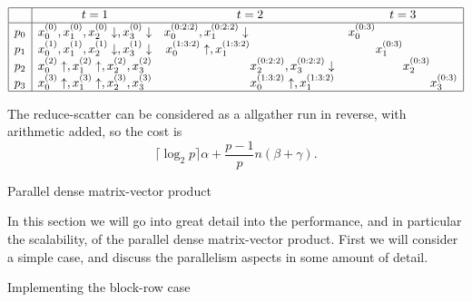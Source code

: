 \[
\begin{array}{|c|ccc|}
\hline
  &t=1&t=2&t=3\\ \hline
p_0&x_0^{(0)},x_1^{(0)},x_2^{(0)}\downarrow,x_3^{(0)}\downarrow
   &x_0^{(0:2:2)},x_1^{(0:2:2)}\downarrow
    \hphantom{x_0^{(0:2:2)},x_1^{(0:2:2)}\downarrow}
   &x_0^{(0:3)}
    \hphantom{x_3^{(0:3)}x_3^{(0:3)}x_3^{(0:3)}}\\
p_1&x_0^{(1)},x_1^{(1)},x_2^{(1)}\downarrow,x_3^{(1)}\downarrow
   &x_0^{(1:3:2)}\uparrow,x_1^{(1:3:2)}
    \hphantom{x_0^{(0:2:2)},x_1^{(0:2:2)}\downarrow}
   &\hphantom{x_3^{(0:3)}} x_1^{(0:3)}
    \hphantom{x_3^{(0:3)}x_3^{(0:3)}} \\
p_2&x_0^{(2)}\uparrow,x_1^{(2)}\uparrow,x_2^{(2)},x_3^{(2)}
   &\hphantom{x_0^{(0:2:2)},x_1^{(0:2:2)}\downarrow}
    x_2^{(0:2:2)},x_3^{(0:2:2)}\downarrow
   &\hphantom{x_3^{(0:3)}x_3^{(0:3)}} x_2^{(0:3)}
    \hphantom{x_3^{(0:3)}}\\
p_3&x_0^{(3)}\uparrow,x_1^{(3)}\uparrow,x_2^{(3)},x_3^{(3)}
   &\hphantom{x_0^{(0:2:2)},x_1^{(0:2:2)}\downarrow}
    x_0^{(1:3:2)}\uparrow,x_1^{(1:3:2)}
   &\hphantom{x_3^{(0:3)}x_3^{(0:3)}x_3^{(0:3)}}
    x_3^{(0:3)}\\
\hline
\end{array}
\]

The reduce-scatter can be considered as a allgather run in reverse,
with arithmetic added, so the cost is 
\[ \lceil \log_2 p\rceil\alpha +\frac{p-1}pn(\beta+\gamma). \]



 {Parallel dense matrix-vector product}
\label{sec:parallel-dense-mvp}

In this section we will go into great detail into the performance, and
in particular the scalability, of the parallel dense matrix-vector
product. First we will consider a simple case, and discuss the
parallelism aspects in some amount of detail.

 {Implementing the block-row case}
\label{sec:blockrow}

